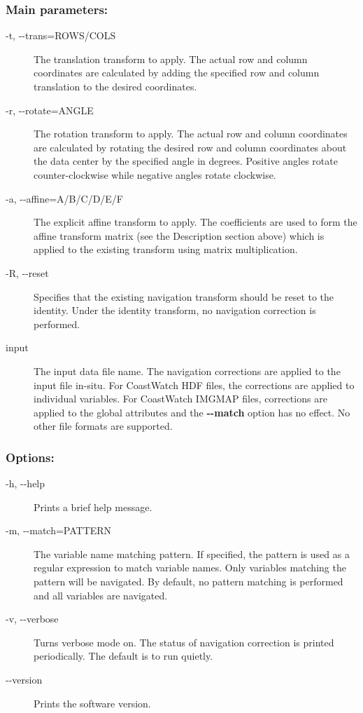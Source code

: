 \subsubsection*{Main parameters:}
\begin{description}
\item[ -t, -{-}trans=ROWS/COLS ] The translation transform to apply. The actual row and column coordinates are calculated by adding the specified row and column translation to the desired coordinates. 
\item[ -r, -{-}rotate=ANGLE ] The rotation transform to apply. The actual row and column coordinates are calculated by rotating the desired row and column coordinates about the data center by the specified angle in degrees. Positive angles rotate counter-clockwise while negative angles rotate clockwise.
\item[ -a, -{-}affine=A/B/C/D/E/F ] The explicit affine transform to apply. The coefficients are used to form the affine transform matrix (see the Description section above) which is applied to the existing transform using matrix multiplication. 
\item[ -R, -{-}reset ] Specifies that the existing navigation transform should be reset to the identity. Under the identity transform, no navigation correction is performed.
\item[ input ] The input data file name. The navigation corrections are applied to the input file in-situ. For CoastWatch HDF files, the corrections are applied to individual variables. For CoastWatch IMGMAP files, corrections are applied to the global attributes and the \textbf{-{-}match}
 option has no effect. No other file formats are supported.

\end{description}
\subsubsection*{Options:}
\begin{description}
\item[ -h, -{-}help ] Prints a brief help message. 
\item[ -m, -{-}match=PATTERN ] The variable name matching pattern. If specified, the pattern is used as a regular expression to match variable names. Only variables matching the pattern will be navigated. By default, no pattern matching is performed and all variables are navigated. 
\item[ -v, -{-}verbose ] Turns verbose mode on. The status of navigation correction is printed periodically. The default is to run quietly. 
\item[-{-}version]Prints the software version.

\end{description}
